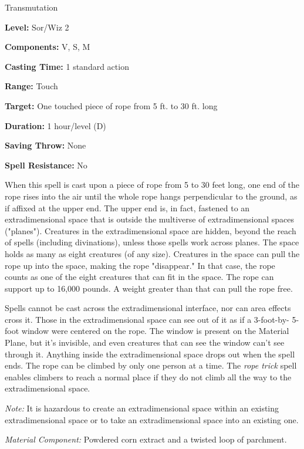 
Transmutation

\textbf{Level:} Sor/Wiz 2

\textbf{Components:} V, S, M

\textbf{Casting Time:} 1 standard action

\textbf{Range:} Touch

\textbf{Target:} One touched piece of rope from 5 ft. to 30 ft. long

\textbf{Duration:} 1 hour/level (D)

\textbf{Saving Throw:} None

\textbf{Spell Resistance:} No

When this spell is cast upon a piece of rope from 5 to 30 feet long, one end of 
the rope rises into the air until the whole rope hangs perpendicular to the ground, 
as if affixed at the upper end. The upper end is, in fact, fastened to an extradimensional 
space that is outside the multiverse of extradimensional spaces ("planes"). Creatures 
in the extradimensional space are hidden, beyond the reach of spells (including 
divinations), unless those spells work across planes. The space holds as many as 
eight creatures (of any size). Creatures in the space can pull the rope up into 
the space, making the rope "disappear." In that case, the rope counts as one 
of the eight creatures that can fit in the space. The rope can support up to 16,000 
pounds. A weight greater than that can pull the rope free.

Spells cannot be cast across the extradimensional interface, nor can area effects 
cross it. Those in the extradimensional space can see out of it as if a 3-foot-by- 
5-foot window were centered on the rope. The window is present on the Material 
Plane, but it's invisible, and even creatures that can see the window can't see 
through it. Anything inside the extradimensional space drops out when the spell 
ends. The rope can be climbed by only one person at a time. The \textit{rope trick 
}spell enables climbers to reach a normal place if they do not climb all the way 
to the extradimensional space.

\textit{Note:} It is hazardous to create an extradimensional space within an existing 
extradimensional space or to take an extradimensional space into an existing one.

\textit{Material Component:} Powdered corn extract and a twisted loop of parchment.

